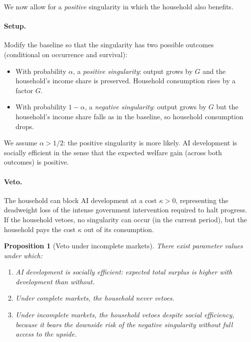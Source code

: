 \documentclass[12pt]{article}
\newtheorem{proposition}{Proposition}
\begin{document}
We now allow for a \emph{positive} singularity in which the household also benefits.

\paragraph{Setup.} Modify the baseline so that the singularity has two possible outcomes (conditional on occurrence and survival):
\begin{itemize}
    \item With probability $\alpha$, a \emph{positive singularity}: output grows by $G$ and the household's income share is preserved. Household consumption rises by a factor $G$.
    \item With probability $1 - \alpha$, a \emph{negative singularity}: output grows by $G$ but the household's income share falls as in the baseline, so household consumption drops.
\end{itemize}
We assume $\alpha > 1/2$: the positive singularity is more likely. AI development is socially efficient in the sense that the expected welfare gain (across both outcomes) is positive.

\paragraph{Veto.} The household can block AI development at a cost $\kappa > 0$, representing the deadweight loss of the intense government intervention required to halt progress. If the household vetoes, no singularity can occur (in the current period), but the household pays the cost $\kappa$ out of its consumption.

\begin{proposition}[Veto under incomplete markets] \label{prop:veto}
There exist parameter values under which:
\begin{enumerate}
    \item AI development is socially efficient: expected total surplus is higher with development than without.
    \item Under complete markets, the household never vetoes.
    \item Under incomplete markets, the household vetoes despite social efficiency, because it bears the downside risk of the negative singularity without full access to the upside.
\end{enumerate}
\end{proposition}
\end{document}
